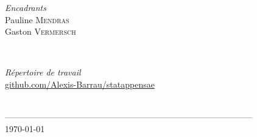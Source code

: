 \documentclass[a4paper,14pt]{article}
\begin{document}
\begin{titlepage}
\begin{minipage}{0.4\textwidth}
\begin{flushleft} \large
\emph{Encadrants}\\
Pauline \textsc{Mendras}\\
Gaston \textsc{Vermersch}\\
\end{flushleft}
\end{minipage}\\[1cm]

\begin{minipage}{0.4\textwidth}
\begin{flushleft} \large
\emph{Répertoire de travail}\\
\url{github.com/Alexis-Barrau/statappensae}\\
\end{flushleft}
\end{minipage}\\[1cm]


 ---------------------------------------------------------------------------------------\\[0.2cm]

{\large \today}\\[2cm]
\vfill

\end{titlepage}



\hspace{6mm} 
\end{document}
